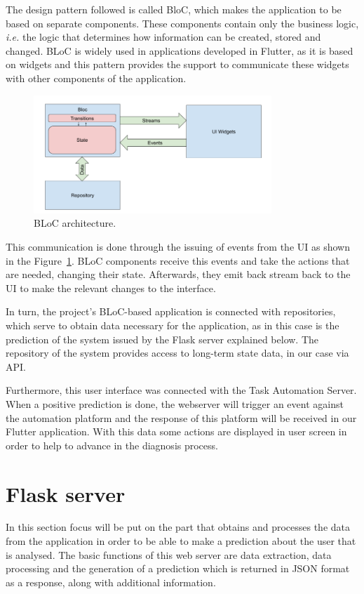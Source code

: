 The design pattern followed is called BloC, which makes the application to be based on separate components. These components contain only the business logic, \textit{i.e.} the logic that determines how information can be created, stored and changed. BLoC is widely used in applications developed in Flutter, as it is based on widgets and this pattern provides the support to communicate these widgets with other components of the application.

\begin{figure}[!htp]
    \centering
    \includegraphics[width=0.8\textwidth]{img/architecture/bloc.png}
    \caption{BLoC architecture.}
    \label{fig:bloc}
\end{figure}

This communication is done through the issuing of events from the UI as shown in the Figure~\ref{fig:bloc}. BLoC components receive this events and take the actions that are needed, changing their state. Afterwards, they emit back stream back to the UI to make the relevant changes to the interface. 

In turn, the project's BLoC-based application is connected with repositories, which serve to obtain data necessary for the application, as in this case is the prediction of the system issued by the Flask server explained below. The repository of the system provides access to long-term state data, in our case via API.

Furthermore, this user interface was connected with the Task Automation Server. When a positive prediction is done, the webserver will trigger an event against the automation platform and the response of this platform will be received in our Flutter application. With this data some actions are displayed in user screen in order to help to advance in the diagnosis process.
\section{Flask server}
\label{sec:server}
 In this section focus will be put on the part that obtains and processes the data from the application in order to be able to make a prediction about the user that is analysed. The basic functions of this  web server are data extraction, data processing and the generation of a prediction which is returned in JSON format as a response, along with additional information.
 

